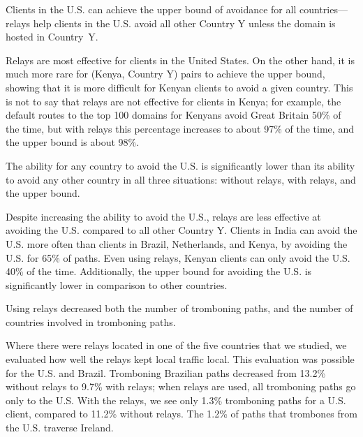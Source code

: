 \begin{finding}
Clients in the U.S. can achieve the upper bound of avoidance for all
countries---relays help clients in
the U.S. avoid all other Country Y unless the domain is hosted in Country~Y.  
\end{finding}
\noindent
Relays are most effective for clients in the United States.  On the other hand, it is much more rare for (Kenya, Country Y) pairs to achieve the upper bound, showing that it is more difficult for Kenyan clients to avoid a given country.  This is not to say that relays are not effective for clients in Kenya; for example, the default routes to the top 100 domains for Kenyans avoid Great Britain 50\% of the time, but with relays this percentage increases to about 97\% of the time, and the upper bound is about 98\%. 

\begin{finding}
The ability for any country to avoid the U.S. is significantly lower than its ability to avoid any other country in all three situations: without relays, with relays, and the upper bound. 
\end{finding}
\noindent
Despite increasing the ability to avoid the U.S., relays are less
effective at avoiding the U.S. compared to all other Country Y.
Clients in India can avoid the U.S. more often than clients in Brazil,
Netherlands, and Kenya, by avoiding the U.S. for 65\% of paths.  Even
using relays, Kenyan clients can only avoid the U.S. 40\% of the time.  Additionally, the upper bound for avoiding the U.S. is significantly lower in comparison to other countries.  

\begin{finding}
Using relays decreased both the number of tromboning paths, and the
number of countries involved in tromboning paths.
\end{finding}
\noindent
Where there were relays located in one of the five
countries that we studied, we evaluated how well the relays kept local
traffic local.  This evaluation was possible for the U.S. and Brazil.
Tromboning Brazilian paths decreased from 13.2\% without relays to
9.7\% with relays; when relays are used, all tromboning paths go only
to the U.S.  With the relays, we see only 1.3\% tromboning paths for a
U.S. client, compared to 11.2\% without relays.  The 1.2\% of
paths that trombones from the U.S. traverse Ireland.

